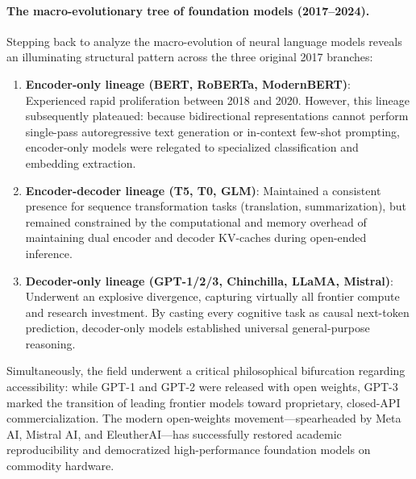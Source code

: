 \documentclass[../../main.tex]{subfiles}
\begin{document}
\paragraph{The macro-evolutionary tree of foundation models (2017--2024).}
Stepping back to analyze the macro-evolution of neural language models reveals an illuminating structural pattern across the three original 2017 branches:
\begin{enumerate}
    \item \textbf{Encoder-only lineage (BERT, RoBERTa, ModernBERT)}: Experienced rapid proliferation between 2018 and 2020. However, this lineage subsequently plateaued: because bidirectional representations cannot perform single-pass autoregressive text generation or in-context few-shot prompting, encoder-only models were relegated to specialized classification and embedding extraction.
    \item \textbf{Encoder-decoder lineage (T5, T0, GLM)}: Maintained a consistent presence for sequence transformation tasks (translation, summarization), but remained constrained by the computational and memory overhead of maintaining dual encoder and decoder KV-caches during open-ended inference.
    \item \textbf{Decoder-only lineage (GPT-1/2/3, Chinchilla, LLaMA, Mistral)}: Underwent an explosive divergence, capturing virtually all frontier compute and research investment. By casting every cognitive task as causal next-token prediction, decoder-only models established universal general-purpose reasoning.
\end{enumerate}

Simultaneously, the field underwent a critical philosophical bifurcation regarding accessibility: while GPT-1 and GPT-2 were released with open weights, GPT-3 marked the transition of leading frontier models toward proprietary, closed-API commercialization. The modern open-weights movement—spearheaded by Meta AI, Mistral AI, and EleutherAI—has successfully restored academic reproducibility and democratized high-performance foundation models on commodity hardware.
\end{document}
